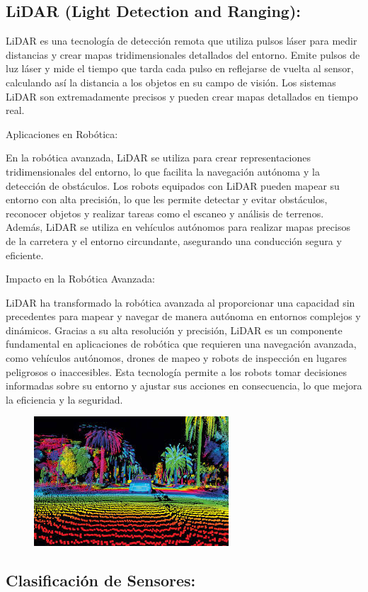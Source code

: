 \subsection{ \textbf{LiDAR (Light Detection and Ranging}):}

LiDAR es una tecnología de detección remota que utiliza pulsos láser para medir distancias y crear mapas tridimensionales detallados del entorno. Emite pulsos de luz láser y mide el tiempo que tarda cada pulso en reflejarse de vuelta al sensor, calculando así la distancia a los objetos en su campo de visión. Los sistemas LiDAR son extremadamente precisos y pueden crear mapas detallados en tiempo real.


Aplicaciones en Robótica:


En la robótica avanzada, LiDAR se utiliza para crear representaciones tridimensionales del entorno, lo que facilita la navegación autónoma y la detección de obstáculos. Los robots equipados con LiDAR pueden mapear su entorno con alta precisión, lo que les permite detectar y evitar obstáculos, reconocer objetos y realizar tareas como el escaneo y análisis de terrenos. Además, LiDAR se utiliza en vehículos autónomos para realizar mapas precisos de la carretera y el entorno circundante, asegurando una conducción segura y eficiente.


Impacto en la Robótica Avanzada:


LiDAR ha transformado la robótica avanzada al proporcionar una capacidad sin precedentes para mapear y navegar de manera autónoma en entornos complejos y dinámicos. Gracias a su alta resolución y precisión, LiDAR es un componente fundamental en aplicaciones de robótica que requieren una navegación avanzada, como vehículos autónomos, drones de mapeo y robots de inspección en lugares peligrosos o inaccesibles. Esta tecnología permite a los robots tomar decisiones informadas sobre su entorno y ajustar sus acciones en consecuencia, lo que mejora la eficiencia y la seguridad.
\begin{figure} [h]
	\centering
	\includegraphics[width=0.3\linewidth]{img/lidar}
	\caption{}
	\label{fig:lidar}
\end{figure}

\subsection{Clasificación de Sensores:}

